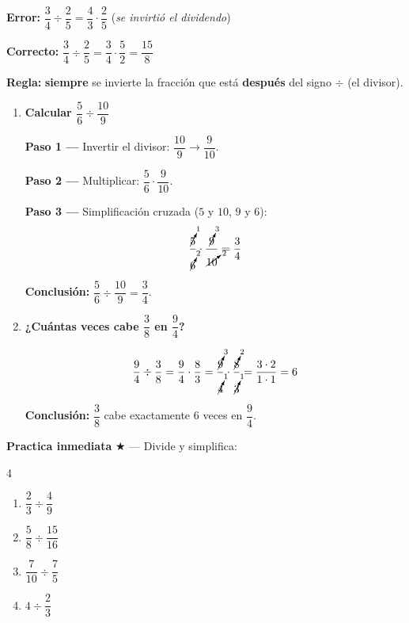 \documentclass[11pt, letterpaper]{article}
\begin{document}
\begin{tcolorbox}[warningbox, title={Error frecuente --- invertir el dividendo en lugar del divisor}]
\noindent\textbf{Error:} $\dfrac{3}{4} \div \dfrac{2}{5} = \dfrac{4}{3} \cdot \dfrac{2}{5}$ \quad (\textit{se invirti\'o el dividendo})

\medskip

\noindent\textbf{Correcto:} $\dfrac{3}{4} \div \dfrac{2}{5} = \dfrac{3}{4} \cdot \dfrac{5}{2} = \dfrac{15}{8}$

\medskip

\noindent\textbf{Regla:} \textbf{siempre} se invierte la fracci\'on que est\'a \textbf{despu\'es} del signo $\div$ (el divisor).
\end{tcolorbox}

\begin{tcolorbox}[examplebox, title={Ejemplos --- divisi\'on de fracciones}]
\begin{enumerate}[label=\textbf{Ej. \arabic*.}, leftmargin=*, itemsep=12pt]

\item \textbf{Calcular $\dfrac{5}{6} \div \dfrac{10}{9}$}

\textbf{Paso 1 ---} Invertir el divisor: $\dfrac{10}{9} \to \dfrac{9}{10}$.

\textbf{Paso 2 ---} Multiplicar: $\dfrac{5}{6} \cdot \dfrac{9}{10}$.

\textbf{Paso 3 ---} Simplificaci\'on cruzada ($5$ y $10$, $9$ y $6$):
$$\frac{\cancelto{1}{5}}{\cancelto{2}{6}} \cdot \frac{\cancelto{3}{9}}{\cancelto{2}{10}} = \frac{3}{4}$$

\textbf{Conclusi\'on:} $\dfrac{5}{6} \div \dfrac{10}{9} = \dfrac{3}{4}$. \checkmark

\item \textbf{¿Cu\'antas veces cabe $\dfrac{3}{8}$ en $\dfrac{9}{4}$?}

$$\frac{9}{4} \div \frac{3}{8} = \frac{9}{4} \cdot \frac{8}{3} = \frac{\cancelto{3}{9}}{\cancelto{1}{4}} \cdot \frac{\cancelto{2}{8}}{\cancelto{1}{3}} = \frac{3 \cdot 2}{1 \cdot 1} = 6$$

\textbf{Conclusi\'on:} $\dfrac{3}{8}$ cabe exactamente $6$ veces en $\dfrac{9}{4}$. \checkmark

\end{enumerate}
\end{tcolorbox}

\medskip
\textbf{Practica inmediata} \quad $\bigstar$ --- Divide y simplifica:
\begin{multicols}{4}
\begin{enumerate}[label=\alph*), leftmargin=*]
  \item $\dfrac{2}{3} \div \dfrac{4}{9}$
  \item $\dfrac{5}{8} \div \dfrac{15}{16}$
  \item $\dfrac{7}{10} \div \dfrac{7}{5}$
  \item $4 \div \dfrac{2}{3}$
\end{enumerate}
\end{multicols}
\end{document}
